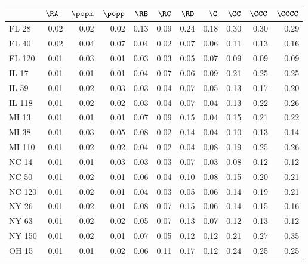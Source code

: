 \begin{tabular}{lrrrrrrrrrr}
\toprule
{} &  $\RA_1$ &  $\popm$ &  $\popp$ &  $\RB$ &  $\RC$ &  $\RD$ &  $\C$ &  $\CC$ &  $\CCC$ &  $\CCCC$ \\
\midrule
FL 28   &     0.02 &     0.02 &     0.02 &   0.13 &   0.09 &   0.24 &  0.18 &   0.30 &    0.30 &     0.29 \\
FL 40   &     0.02 &     0.04 &     0.07 &   0.04 &   0.02 &   0.07 &  0.06 &   0.11 &    0.13 &     0.16 \\
FL 120  &     0.01 &     0.03 &     0.01 &   0.03 &   0.03 &   0.05 &  0.07 &   0.09 &    0.09 &     0.09 \\
IL 17   &     0.01 &     0.01 &     0.01 &   0.04 &   0.07 &   0.06 &  0.09 &   0.21 &    0.25 &     0.25 \\
IL 59   &     0.01 &     0.02 &     0.03 &   0.03 &   0.04 &   0.07 &  0.05 &   0.13 &    0.17 &     0.20 \\
IL 118  &     0.01 &     0.02 &     0.02 &   0.03 &   0.04 &   0.07 &  0.04 &   0.13 &    0.22 &     0.26 \\
MI 13   &     0.01 &     0.01 &     0.01 &   0.07 &   0.09 &   0.15 &  0.04 &   0.15 &    0.21 &     0.22 \\
MI 38   &     0.01 &     0.03 &     0.05 &   0.08 &   0.02 &   0.14 &  0.04 &   0.10 &    0.13 &     0.14 \\
MI 110  &     0.01 &     0.02 &     0.02 &   0.04 &   0.02 &   0.04 &  0.08 &   0.19 &    0.25 &     0.26 \\
NC 14   &     0.01 &     0.01 &     0.03 &   0.03 &   0.03 &   0.07 &  0.03 &   0.08 &    0.12 &     0.12 \\
NC 50   &     0.01 &     0.02 &     0.01 &   0.06 &   0.04 &   0.10 &  0.08 &   0.15 &    0.20 &     0.21 \\
NC 120  &     0.01 &     0.02 &     0.01 &   0.04 &   0.03 &   0.05 &  0.06 &   0.14 &    0.19 &     0.21 \\
NY 26   &     0.01 &     0.02 &     0.01 &   0.08 &   0.07 &   0.15 &  0.06 &   0.14 &    0.15 &     0.16 \\
NY 63   &     0.01 &     0.02 &     0.02 &   0.05 &   0.07 &   0.13 &  0.07 &   0.12 &    0.13 &     0.12 \\
NY 150  &     0.01 &     0.02 &     0.01 &   0.07 &   0.05 &   0.12 &  0.12 &   0.21 &    0.27 &     0.35 \\
OH 15   &     0.01 &     0.01 &     0.02 &   0.06 &   0.11 &   0.17 &  0.12 &   0.24 &    0.25 &     0.25 \\

\end{tabular}
